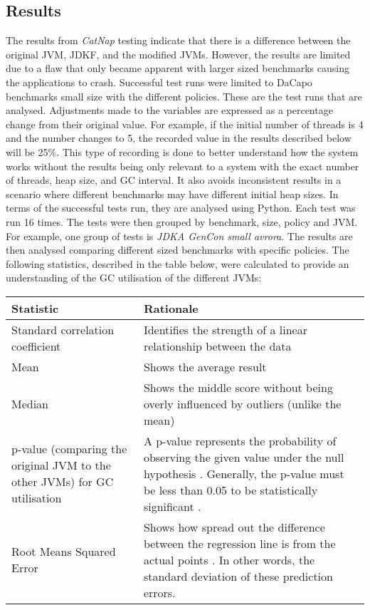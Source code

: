 \subsection{Results}
The results from \emph{CatNap} testing indicate that there is a difference
between the original JVM, JDKF, and the modified JVMs. However, the
results are limited due to a flaw that only became apparent with larger
sized benchmarks causing the applications to crash. Successful test runs were limited to DaCapo benchmarks small size with the different policies. These are the test runs
that are analysed. 
\newline\newline
Adjustments made to the variables are expressed as a
percentage change from their original value. For example, if the initial
number of threads is 4 and the number changes to 5, the recorded value
in the results described below will be 25\%. This type of recording is
done to better understand how the system works without the results being
only relevant to a system with the exact number of threads, heap size,
and GC interval. It also avoids inconsistent results in a scenario where
different benchmarks may have different initial heap sizes. 
\newline\newline
In terms of the successful tests run, they are analysed using Python. Each test was run 16 times. The tests were then grouped by benchmark, size, policy and JVM. For example, one group of tests is \emph{JDKA GenCon small avrora}. The results are then analysed comparing different sized benchmarks with specific policies. The following
statistics, described in the table below, were calculated to provide an
understanding of the GC utilisation of the different JVMs:
\begin{center}
\begin{tabular}{ |p{3cm}| p{7cm}| }
    \hline

 \textbf{Statistic} & \textbf{Rationale}  \\ 
     \hline

 Standard correlation coefficient & Identifies the strength of a linear relationship between the data \cite{lawrence1989concordance}  \\  
     \hline

 Mean & Shows the average result \\
     \hline

 Median & Shows the middle score without being overly influenced by outliers (unlike the mean)\\
     \hline

 p-value (comparing the original JVM to the other JVMs) for GC utilisation & A p-value represents the probability of observing the given value under the null hypothesis \cite{ferreira2015does}. Generally, the p-value must be less than 0.05 to be statistically significant \cite{glantz2001even}. \\
     \hline
 Root Means Squared Error & Shows how spread out the difference between the regression line is from the actual points \cite{chinrungrueng1995optimal}. In other words, the standard deviation of these prediction errors. \\
 \hline
\end{tabular}
\end{center}
